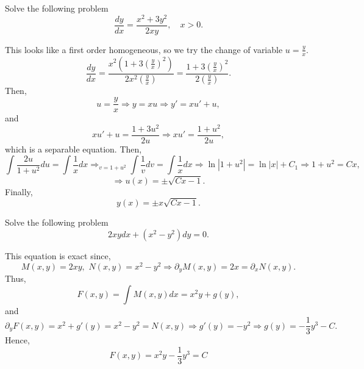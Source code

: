 \documentclass[11pt]{article}
\begin{document}
\begin{problem}
Solve the following problem
\begin{equation*}
\frac{dy}{dx}=\frac{x^{2}+3y^{2}}{2xy}, \quad x>0. 
\end{equation*}
\end{problem}
\begin{solution}
This looks like a first order homogeneous, so we try the change of variable $u=\frac{y}{x}$. 
\[\frac{dy}{dx}=\frac{x^{2}(1+3\left(\frac{y}{x}\right)^{2})}{2x^{2}\left(\frac{y}{x}\right)}= \frac{1+3\left(\frac{y}{x}\right)^{2}}{2\left(\frac{y}{x}\right)}.\]
Then,
\[u=\frac{y}{x} \Rightarrow y= x u \Rightarrow y' = x u' + u,\]
and
\[xu' + u = \frac{1+3u^{2}}{2u}\Rightarrow x u' = \frac{1+u^{2}}{2u},\]
which is a separable equation. Then,
\[\int\frac{2u}{1+u^{2}}du = \int \frac{1}{x}dx \Rightarrow_{v=1+u^{2}}\int \frac{1}{v}dv = \int \frac{1}{x}dx \Rightarrow \ln |1+u^{2}|=\ln|x|+C_{1} \Rightarrow 1+u^{2}=Cx,\]
\[\Rightarrow u(x)=\pm \sqrt{Cx-1}.\]
Finally,
\[\boxed{y(x) = \pm x \sqrt{Cx-1}}.\]
\end{solution}



\begin{problem}
Solve the following problem
\begin{equation*}
2xy dx+(x^{2}-y^{2})dy=0. 
\end{equation*}
\end{problem}
\begin{solution}
This equation is exact since,
\[M(x,y)=2xy,\,\, N(x,y)= x^{2}-y^{2} \Rightarrow \partial_{y}M(x,y)= 2x = \partial_{x}N(x,y). \]
Thus, 
\[F(x,y)= \int M(x,y) dx = x^{2}y + g(y),\]
and
\[\partial_{y}F(x,y)=x^{2}+g'(y) = x^{2}-y^{2} = N(x,y) \Rightarrow g'(y) = -y^{2} \Rightarrow g(y)= -\frac{1}{3}y^{3}-C.\]
Hence,
\[\boxed{F(x,y)=x^{2}y-\frac{1}{3}y^{3}=C}\]
\end{solution}
\end{document}
